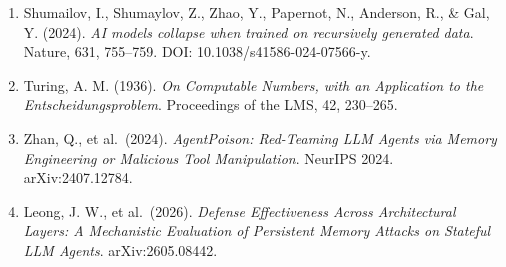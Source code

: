 \documentclass[
]{ctexart}
\begin{document}
\begin{enumerate}
{  Correct but Non-Transferable Experiences}. arXiv:2605.18930.
\item
  Shumailov, I., Shumaylov, Z., Zhao, Y., Papernot, N., Anderson, R., \&
  Gal, Y. (2024). \emph{AI models collapse when trained on recursively
  generated data}. Nature, 631, 755--759. DOI:
  10.1038/s41586-024-07566-y.
\item
  Turing, A. M. (1936). \emph{On Computable Numbers, with an Application
  to the Entscheidungsproblem}. Proceedings of the LMS, 42, 230--265.
\item
  Zhan, Q., et al.~(2024). \emph{AgentPoison: Red-Teaming LLM Agents via
  Memory Engineering or Malicious Tool Manipulation}. NeurIPS 2024.
  arXiv:2407.12784.
\item
  Leong, J. W., et al.~(2026). \emph{Defense Effectiveness Across
  Architectural Layers: A Mechanistic Evaluation of Persistent Memory
  Attacks on Stateful LLM Agents}. arXiv:2605.08442.
\end{enumerate}
\end{document}
